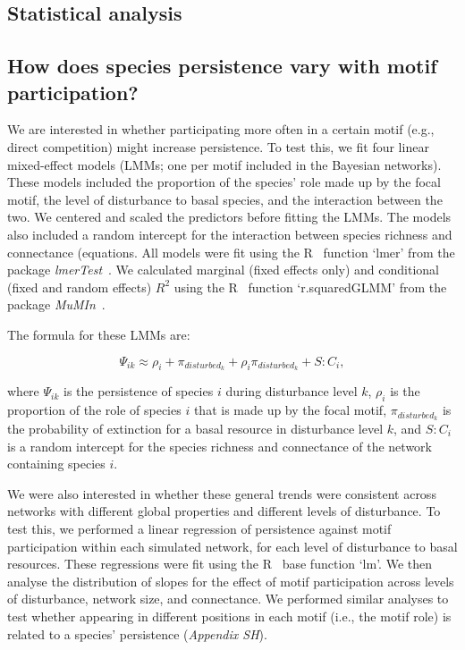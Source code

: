 \documentclass[12pt]{article}
\begin{document}
\begin{spacing}{2.0}
\section{Statistical analysis}
 \subsection*{How does species persistence vary with motif participation?}

            We are interested in whether participating more often in a certain motif (e.g., direct competition) might increase persistence.
            To test this, we fit four linear mixed-effect models (LMMs; one per motif included in the Bayesian networks).
            These models included the proportion of the species' role made up by the focal motif, the level of disturbance to basal species, and the interaction between the two.
            We centered and scaled the predictors before fitting the LMMs.
            The models also included a random intercept for the interaction between species richness and connectance (equations.
            All models were fit using the R~\citep{R} function `lmer' from the package \emph{lmerTest}~\citep{lmerTest}.
            We calculated marginal (fixed effects only) and conditional (fixed and random effects) $R^2$ using the R~\citep{R} function `r.squaredGLMM' from the package \emph{MuMIn}~\citep{MuMIn}.

            The formula for these LMMs are:       
            
            \begin{equation}
                \Psi_{ik} \approx \rho_{i} + \pi_{disturbed_k} + \rho_{i}\pi_{disturbed_k} +
                S:C_{i} ,
                \label{propreq}
            \end{equation}


            where $\Psi_{ik}$ is the persistence of species $i$ during disturbance level $k$, $\rho_{i}$ is the proportion of the role of species $i$ that is made up by the focal motif, $\pi_{disturbed_k}$ is the probability of extinction for a basal resource in disturbance level $k$, and $S:C_{i}$ is a random intercept for the species richness and connectance of the network containing species $i$.
            
            We were also interested in whether these general trends were consistent across networks with different global properties and different levels of disturbance. 
            To test this, we performed a linear regression of persistence against motif participation within each simulated network, for each level of disturbance to basal resources.
            These regressions were fit using the R~\citep{R} base function `lm'.
            We then analyse the distribution of slopes for the effect of motif participation across levels of disturbance, network size, and connectance. 
            We performed similar analyses to test whether appearing in different positions in each motif (i.e., the motif role) is related to a species' persistence (\emph{Appendix SH}).


\end{spacing}
\end{document}
